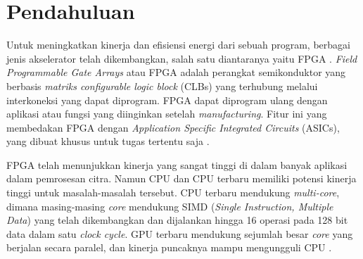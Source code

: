 \section{Pendahuluan}



Untuk meningkatkan kinerja dan efisiensi energi dari sebuah program, berbagai jenis akselerator telah dikembangkan, salah satu diantaranya yaitu FPGA \cite{lb:cong}. \textit{Field Programmable Gate Arrays} atau FPGA adalah perangkat semikonduktor yang berbasis \textit{matriks configurable logic block} (CLBs) yang terhubung melalui interkoneksi yang dapat diprogram. FPGA dapat diprogram ulang dengan aplikasi atau fungsi yang diinginkan setelah \textit{manufacturing}. Fitur ini yang membedakan FPGA dengan \textit{Application Specific Integrated Circuits} (ASICs), yang dibuat khusus untuk tugas tertentu saja \cite{XILINX}.

FPGA telah menunjukkan kinerja yang sangat tinggi di dalam banyak aplikasi dalam pemrosesan citra. Namun CPU dan CPU terbaru memiliki potensi kinerja tinggi untuk masalah-masalah tersebut. CPU terbaru mendukung \textit{multi-core}, dimana masing-masing \textit{core} mendukung SIMD (\textit{Single Instruction, Multiple Data}) yang telah dikembangkan dan dijalankan hingga 16 operasi pada 128 bit data dalam satu \textit{clock cycle}. GPU terbaru mendukung sejumlah besar \textit{core} yang berjalan secara paralel, dan kinerja puncaknya mampu mengungguli CPU \cite{lb:asano}.

